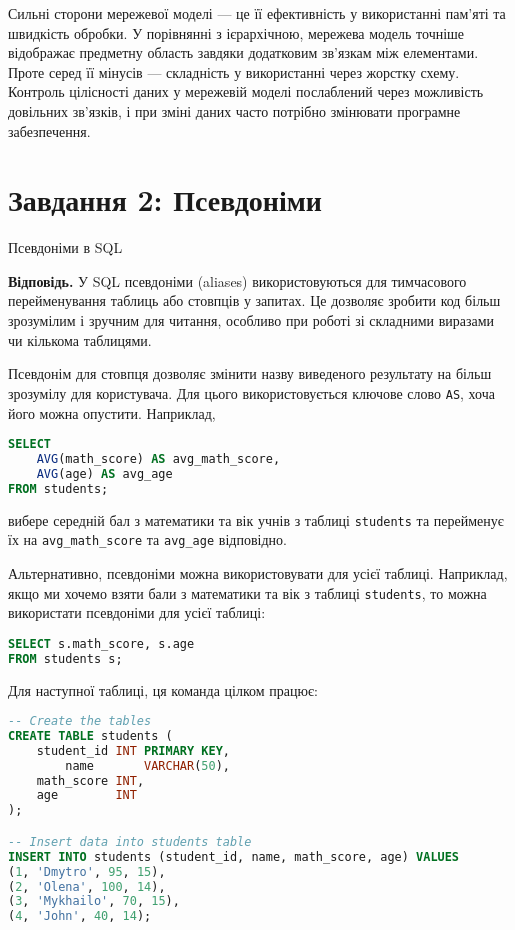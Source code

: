 \documentclass{hw_template}
\begin{document}
Сильні сторони мережевої моделі — це її ефективність у використанні пам'яті та
швидкість обробки. У порівнянні з ієрархічною, мережева модель точніше
відображає предметну область завдяки додатковим зв’язкам між елементами. Проте
серед її мінусів — складність у використанні через жорстку схему. Контроль
цілісності даних у мережевій моделі послаблений через можливість довільних
зв’язків, і при зміні даних часто потрібно змінювати програмне забезпечення. 

\newpage

\section{Завдання 2: Псевдоніми}

\begin{problem}
    Псевдоніми в SQL
\end{problem}

\textbf{Відповідь.} У SQL псевдоніми (aliases) використовуються для тимчасового
перейменування таблиць або стовпців у запитах. Це дозволяє зробити код більш
зрозумілим і зручним для читання, особливо при роботі зі складними виразами чи
кількома таблицями.

Псевдонім для стовпця дозволяє змінити назву виведеного результату на більш
зрозумілу для користувача. Для цього використовується ключове слово \texttt{AS}, хоча
його можна опустити. Наприклад,
\begin{lstlisting}[language=SQL]
SELECT 
    AVG(math_score) AS avg_math_score,
    AVG(age) AS avg_age
FROM students;
\end{lstlisting}

вибере середній бал з математики та вік учнів з таблиці \texttt{students} та
перейменує їх на \texttt{avg\_math\_score} та \texttt{avg\_age} відповідно.

Альтернативно, псевдоніми можна використовувати для усієї таблиці. Наприклад,
якщо ми хочемо взяти бали з математики та вік з таблиці \texttt{students}, 
то можна використати псевдоніми для усієї таблиці:
\begin{lstlisting}[language=SQL]
SELECT s.math_score, s.age
FROM students s;
\end{lstlisting}

Для наступної таблиці, ця команда цілком працює:
\begin{lstlisting}[language=SQL]
-- Create the tables
CREATE TABLE students (
    student_id INT PRIMARY KEY,
        name       VARCHAR(50),
    math_score INT,
    age        INT
);

-- Insert data into students table
INSERT INTO students (student_id, name, math_score, age) VALUES
(1, 'Dmytro', 95, 15),
(2, 'Olena', 100, 14),
(3, 'Mykhailo', 70, 15),
(4, 'John', 40, 14);
\end{lstlisting}
\end{document}

